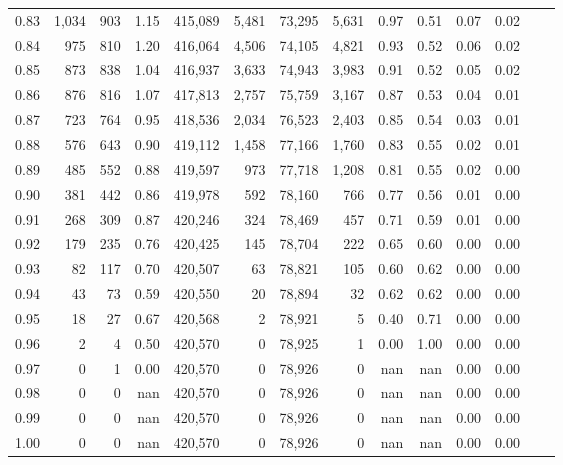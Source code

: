 \begin{tabular}{rrrrrrrrrrrrrr}
0.83 &   1,034 &    903 &    1.15 &  415,089 &    5,481 &  73,295 &   5,631 &  0.97 &  0.51 &  0.07 &      0.02 \\
0.84 &     975 &    810 &    1.20 &  416,064 &    4,506 &  74,105 &   4,821 &  0.93 &  0.52 &  0.06 &      0.02 \\
0.85 &     873 &    838 &    1.04 &  416,937 &    3,633 &  74,943 &   3,983 &  0.91 &  0.52 &  0.05 &      0.02 \\
0.86 &     876 &    816 &    1.07 &  417,813 &    2,757 &  75,759 &   3,167 &  0.87 &  0.53 &  0.04 &      0.01 \\
0.87 &     723 &    764 &    0.95 &  418,536 &    2,034 &  76,523 &   2,403 &  0.85 &  0.54 &  0.03 &      0.01 \\
0.88 &     576 &    643 &    0.90 &  419,112 &    1,458 &  77,166 &   1,760 &  0.83 &  0.55 &  0.02 &      0.01 \\
0.89 &     485 &    552 &    0.88 &  419,597 &      973 &  77,718 &   1,208 &  0.81 &  0.55 &  0.02 &      0.00 \\
0.90 &     381 &    442 &    0.86 &  419,978 &      592 &  78,160 &     766 &  0.77 &  0.56 &  0.01 &      0.00 \\
0.91 &     268 &    309 &    0.87 &  420,246 &      324 &  78,469 &     457 &  0.71 &  0.59 &  0.01 &      0.00 \\
0.92 &     179 &    235 &    0.76 &  420,425 &      145 &  78,704 &     222 &  0.65 &  0.60 &  0.00 &      0.00 \\
0.93 &      82 &    117 &    0.70 &  420,507 &       63 &  78,821 &     105 &  0.60 &  0.62 &  0.00 &      0.00 \\
0.94 &      43 &     73 &    0.59 &  420,550 &       20 &  78,894 &      32 &  0.62 &  0.62 &  0.00 &      0.00 \\
0.95 &      18 &     27 &    0.67 &  420,568 &        2 &  78,921 &       5 &  0.40 &  0.71 &  0.00 &      0.00 \\
0.96 &       2 &      4 &    0.50 &  420,570 &        0 &  78,925 &       1 &  0.00 &  1.00 &  0.00 &      0.00 \\
0.97 &       0 &      1 &    0.00 &  420,570 &        0 &  78,926 &       0 &   nan &   nan &  0.00 &      0.00 \\
0.98 &       0 &      0 &     nan &  420,570 &        0 &  78,926 &       0 &   nan &   nan &  0.00 &      0.00 \\
0.99 &       0 &      0 &     nan &  420,570 &        0 &  78,926 &       0 &   nan &   nan &  0.00 &      0.00 \\
1.00 &       0 &      0 &     nan &  420,570 &        0 &  78,926 &       0 &   nan &   nan &  0.00 &      0.00 \\
\bottomrule
\end{tabular}
